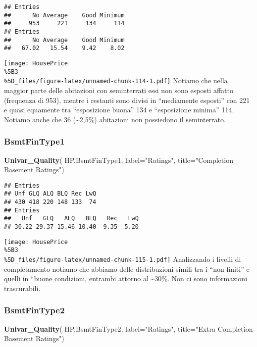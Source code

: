 \documentclass[
]{article}
\newenvironment{Shaded}{\begin{snugshade}}{\end{snugshade}}
\newcommand{\AttributeTok}[1]{\textcolor[rgb]{0.13,0.29,0.53}{#1}}
\newcommand{\FunctionTok}[1]{\textcolor[rgb]{0.13,0.29,0.53}{\textbf{#1}}}
\newcommand{\NormalTok}[1]{#1}
\newcommand{\StringTok}[1]{\textcolor[rgb]{0.31,0.60,0.02}{#1}}
\begin{document}
\begin{verbatim}
## Entries
##      No Average    Good Minimum 
##     953     221     134     114 
## Entries
##      No Average    Good Minimum 
##   67.02   15.54    9.42    8.02
\end{verbatim}

\texttt{[image: HousePrice\\\%5B3\\\%5D\_files/figure-latex/unnamed-chunk-114-1.pdf]}
Notiamo che nella maggior parte delle abitazioni con seminterrati essi
non sono esposti affatto (frequenza di 953), mentre i restanti sono
divisi in ``mediamente esposti'' con 221 e quasi equamente tra
``esposizione buona'' 134 e ``esposizione minima'' 114. Notiamo anche
che 36 (\textasciitilde2,5\%) abitazioni non possiedono il seminterrato.

\subsubsection{BsmtFinType1}\label{bsmtfintype1}

\begin{Shaded}
\begin{Highlighting}[]
\FunctionTok{Univar\_Quality}\NormalTok{(}
\NormalTok{  HP,BsmtFinType1,}
  \AttributeTok{label=}\StringTok{"Ratings"}\NormalTok{,}
  \AttributeTok{title=}\StringTok{"Completion Basement Ratings"}\NormalTok{)}
\end{Highlighting}
\end{Shaded}

\begin{verbatim}
## Entries
## Unf GLQ ALQ BLQ Rec LwQ 
## 430 418 220 148 133  74 
## Entries
##   Unf   GLQ   ALQ   BLQ   Rec   LwQ 
## 30.22 29.37 15.46 10.40  9.35  5.20
\end{verbatim}

\texttt{[image: HousePrice\\\%5B3\\\%5D\_files/figure-latex/unnamed-chunk-115-1.pdf]}
Analizzando i livelli di completamento notiamo che abbiamo delle
distribuzioni simili tra i ``non finiti'' e quelli in ``buone
condizioni, entrambi attorno al \textasciitilde30\%. Non ci sono
informazioni trascurabili.

\subsubsection{BsmtFinType2}\label{bsmtfintype2}

\begin{Shaded}
\begin{Highlighting}[]
\FunctionTok{Univar\_Quality}\NormalTok{(}
\NormalTok{  HP,BsmtFinType2,}
  \AttributeTok{label=}\StringTok{"Ratings"}\NormalTok{,}
  \AttributeTok{title=}\StringTok{"Extra Completion Basement Ratings"}\NormalTok{)}
\end{Highlighting}
\end{Shaded}
\end{document}
